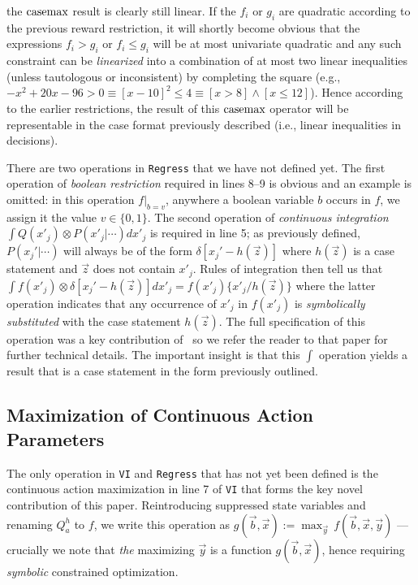 the $\mathrm{casemax}$ result is clearly still linear.  If the $f_i$ or $g_i$
are quadratic according to the previous reward restriction, it will
shortly become obvious that the expressions $f_i > g_i$ or $f_i \leq
g_i$ will be at most univariate quadratic and any such constraint
can be \emph{linearized} into a combination of at most 
two linear inequalities (unless tautologous or inconsistent) 
by completing the square (e.g., 
$-x^2 + 20x - 96 > 0 \equiv [x - 10]^2 \leq 4 \equiv [x > 8] \land [x \leq 12]$).  Hence
according to the earlier restrictions, the result of this $\mathrm{casemax}$
operator will be representable in the case format previously described
(i.e., linear inequalities in decisions).

There are two operations in \texttt{Regress} that we have not defined
yet.  The first operation of \emph{boolean restriction} required in
lines 8--9 is obvious and an example is omitted: in this operation
$f|_{b=v}$, anywhere a boolean variable $b$ occurs in $f$, we assign
it the value $v \in \{ 0,1 \}$.  The second operation of
\emph{continuous integration} $\int Q(x'_j) \otimes P(x'_j|\cdots)
dx'_j$ is required in line 5; as previously defined, $P(x_j'|\cdots)$
will always be of the form $\delta[x_j' - h(\vec{z})]$ where
$h(\vec{z})$ is a case statement and $\vec{z}$ does not contain
$x'_j$.  Rules of integration then tell us that $\int f(x'_j) \otimes
\delta[x_j' - h(\vec{z})] dx'_j = f(x'_j) \{ x'_j / h(\vec{z}) \}$
where the latter operation indicates that any occurrence of $x'_j$ in
$f(x'_j)$ is \emph{symbolically substituted} with the case statement
$h(\vec{z})$.  The full specification of this operation was a key
contribution of~\cite{sanner_uai11} so we refer the reader to that
paper for further technical details.  The
important insight is that this $\int$ operation yields a result that is a
case statement in the form previously outlined.

\subsection{Maximization of Continuous Action Parameters}

The only operation in \texttt{VI} and \texttt{Regress} that has not
yet been defined is the continuous action maximization in line 7 of
\texttt{VI} that forms the key novel contribution of this paper.
Reintroducing suppressed state variables and renaming $Q_a^{h}$ to
$f$, we write this operation as $g(\vec{b},\vec{x}) := \max_{\vec{y}}
\, f(\vec{b},\vec{x},\vec{y})$ --- crucially we note that 
\emph{the} maximizing $\vec{y}$ is a function
$g(\vec{b},\vec{x})$, hence requiring \emph{symbolic} 
constrained optimization.

